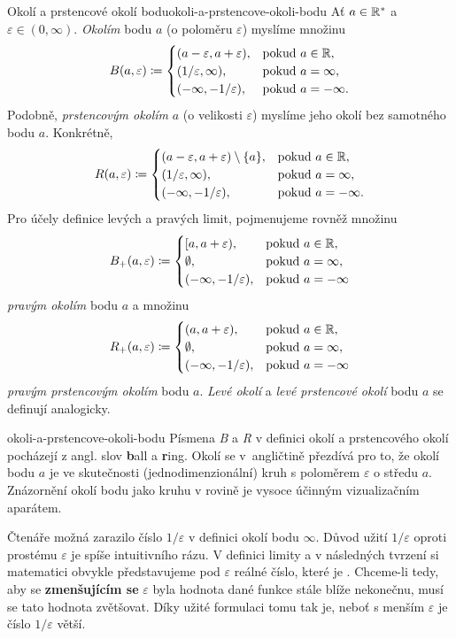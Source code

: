 \begin{definition}{Okolí a prstencové okolí bodu}{okoli-a-prstencove-okoli-bodu}
Ať $a \in \mathbb{R}^*$ a $\varepsilon \in (0,\infty)$. \emph{Okolím} bodu $a$ (o
poloměru $\varepsilon$) myslíme množinu
\[
 B(a,\varepsilon) \coloneqq \begin{cases}
  (a-\varepsilon,a+\varepsilon), & \text{pokud } a \in \mathbb{R},\\
  (1 / \varepsilon, \infty), &\text{pokud } a = \infty,\\
  (-\infty,-1 / \varepsilon), &\text{pokud } a = -\infty.
 \end{cases}
\]
Podobně, \emph{prstencovým okolím} $a$ (o velikosti $\varepsilon$) myslíme jeho
okolí bez samotného bodu $a$. Konkrétně,
\[
 R(a,\varepsilon) \coloneqq \begin{cases}
  (a-\varepsilon,a+\varepsilon) \setminus \{a\}, &\text{pokud }a \in \mathbb{R},\\
  (1 / \varepsilon,\infty), & \text{pokud } a = \infty,\\
  (-\infty,-1 / \varepsilon), &\text{pokud } a = -\infty.
 \end{cases}
\]
Pro účely definice levých a pravých limit, pojmenujeme rovněž množinu
\[
 B_+(a,\varepsilon) \coloneqq \begin{cases}
  [a,a+\varepsilon), &\text{pokud }a \in \mathbb{R},\\
  \emptyset, &\text{pokud }a = \infty,\\
  (-\infty,-1 / \varepsilon), &\text{pokud }a = -\infty
 \end{cases}
\]
\emph{pravým okolím} bodu $a$ a množinu
\[
 R_+(a,\varepsilon) \coloneqq \begin{cases}
  (a,a+\varepsilon), &\text{pokud }a \in \mathbb{R},\\
  \emptyset, &\text{pokud }a = \infty,\\
  (-\infty,-1 / \varepsilon), &\text{pokud }a = -\infty
 \end{cases}
\]
\emph{pravým prstencovým okolím} bodu $a$. \emph{Levé okolí} a \emph{levé
prstencové okolí} bodu $a$ se definují analogicky.
\end{definition}

\begin{remark}{}{okoli-a-prstencove-okoli-bodu}
 Písmena \emph{B} a \emph{R} v definici okolí a prstencového okolí pocházejí z
 angl. slov \textbf{b}all a \textbf{r}ing. Okolí se v~angličtině přezdívá
  pro to, že okolí bodu $a$ je ve skutečnosti (jednodimenzionální) kruh
 s poloměrem $\varepsilon$ o středu $a$. Znázornění okolí bodu jako kruhu v
 rovině je vysoce účinným vizualizačním aparátem.

 Čtenáře možná zarazilo číslo $1 / \varepsilon$ v definici okolí bodu $\infty$.
 Důvod užití $1 / \varepsilon$ oproti prostému $\varepsilon$ je spíše
 intuitivního rázu. V definici limity a v následných tvrzení si matematici
 obvykle představujeme pod $\varepsilon$ reálné číslo, které je . Chceme-li tedy, aby se \textbf{zmenšujícím se} $\varepsilon$ byla
 hodnota dané funkce stále blíže nekonečnu, musí se tato hodnota zvětšovat. Díky
 užité formulaci tomu tak je, neboť s menším $\varepsilon$ je číslo $1 /
 \varepsilon$ větší.
\end{remark}

